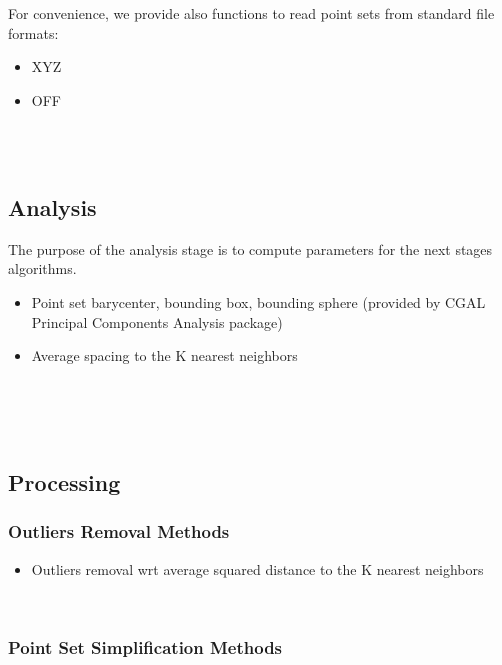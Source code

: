 For convenience, we provide also functions to read point sets from standard file formats:

\begin{itemize}
\item XYZ
\item OFF
\end{itemize}

  \\
  \\


\subsection{Analysis}

The purpose of the analysis stage is to compute parameters for the next stages algorithms.

\begin{itemize}
\item Point set barycenter, bounding box, bounding sphere (provided by CGAL Principal Components Analysis package)
\item Average spacing to the K nearest neighbors
\end{itemize}

  \\
  \\
  \\


\subsection{Processing}

\subsubsection{Outliers Removal Methods}

\begin{itemize}
\item Outliers removal wrt average squared distance to the K nearest neighbors
\end{itemize}

  \\


\subsubsection{Point Set Simplification Methods}

